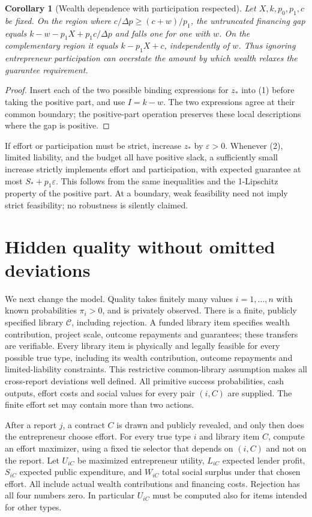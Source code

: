 \documentclass[11pt]{article}
\newtheorem{corollary}[theorem]{Corollary}
\theoremstyle{remark}
\begin{document}
\begin{corollary}[Wealth dependence with participation respected]
Let $X,k,p_0,p_1,c$ be fixed. On the region where
$c/\Delta p\geq(c+w)/p_1$, the untruncated financing gap equals
$k-w-p_1X+p_1c/\Delta p$ and falls one for one with $w$.
On the complementary region it equals $k-p_1X+c$, independently of $w$.
Thus ignoring entrepreneur participation can overstate the amount by which
wealth relaxes the guarantee requirement.
\end{corollary}
\begin{proof}
Insert each of the two possible binding expressions for $z_*$ into (1)
before taking the positive part, and use $I=k-w$. The two expressions
agree at their common boundary; the positive-part operation preserves
these local descriptions where the gap is positive.
\end{proof}
If effort or participation must be strict, increase $z_*$ by
$\varepsilon>0$. Whenever (2), limited liability, and the budget all have
positive slack, a sufficiently small increase strictly implements effort
and participation, with expected guarantee at most $S_*+p_1\varepsilon$.
This follows from the same inequalities and the 1-Lipschitz property of
the positive part. At a boundary, weak feasibility need not imply strict
feasibility; no robustness is silently claimed.

\section{Hidden quality without omitted deviations}
We next change the model. Quality takes finitely many values
$i=1,\ldots,n$ with known probabilities $\pi_i>0$, and is privately observed.
There is a finite, publicly specified library $\mathcal C$, including
rejection. A funded library item specifies wealth contribution, project
scale, outcome repayments and guarantees; these transfers are verifiable.
Every library item is physically and legally feasible for every possible
true type, including its wealth contribution, outcome repayments and
limited-liability constraints. This restrictive common-library assumption
makes all cross-report deviations well defined. All primitive success
probabilities, cash outputs, effort costs and social values for every pair
$(i,C)$ are supplied. The finite effort set may
contain more than two actions.

After a report $j$, a contract $C$ is drawn and publicly revealed, and only
then does the entrepreneur choose effort. For every true type $i$ and
library item $C$, compute an effort maximizer, using a fixed tie selector
that depends on $(i,C)$ and not on the report. Let $U_{iC}$ be maximized
entrepreneur utility, $L_{iC}$ expected lender profit, $S_{iC}$ expected
public expenditure, and $W_{iC}$ total social surplus under that chosen
effort. All include actual wealth contributions and financing costs.
Rejection has all four numbers zero. In particular $U_{iC}$ must be computed
also for items intended for other types.
\end{document}
